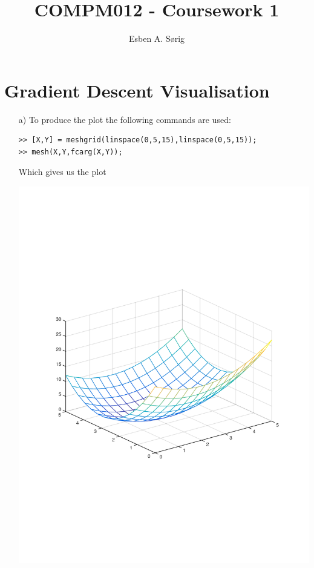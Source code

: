 \documentclass[11pt]{article}
\begin{document}
\lstset{language=Matlab}

\title{COMPM012 - Coursework 1}
\author{Esben A. S\o rig}

\maketitle

\section{Gradient Descent Visualisation}
\begin{itemize}
    \item[a)] To produce the plot the following commands are used:
        \begin{lstlisting}
>> [X,Y] = meshgrid(linspace(0,5,15),linspace(0,5,15));
>> mesh(X,Y,fcarg(X,Y));
        \end{lstlisting}
    
        \par Which gives us the plot
        \begin{center}
        \includegraphics[width=\linewidth]{1a}
        \end{center}
    

\end{itemize}
\end{document}
